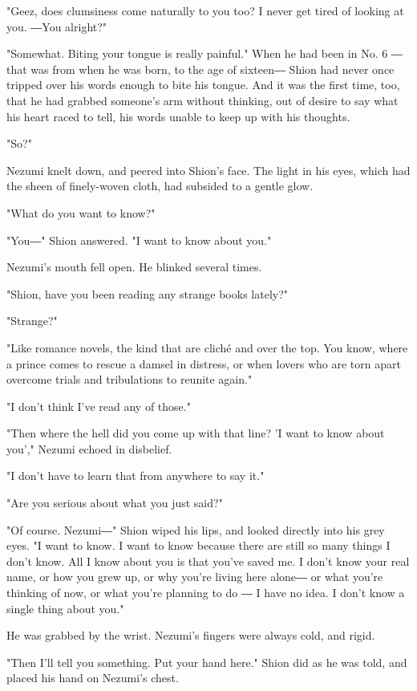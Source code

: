 "Geez, does clumsiness come naturally to you too? I never get tired of
looking at you. ―You alright?"

"Somewhat. Biting your tongue is really painful." When he had been in
No. 6 ― that was from when he was born, to the age of sixteen― Shion had
never once tripped over his words enough to bite his tongue. And it was
the first time, too, that he had grabbed someone's arm without thinking,
out of desire to say what his heart raced to tell, his words unable to
keep up with his thoughts.

"So?"

Nezumi knelt down, and peered into Shion's face. The light in his eyes,
which had the sheen of finely-woven cloth, had subsided to a gentle
glow.

"What do you want to know?"

"You―" Shion answered. "I want to know about you."

Nezumi's mouth fell open. He blinked several times.

"Shion, have you been reading any strange books lately?"

"Strange?"

"Like romance novels, the kind that are cliché and over the top. You
know, where a prince comes to rescue a damsel in distress, or when
lovers who are torn apart overcome trials and tribulations to reunite
again."

"I don't think I've read any of those."

"Then where the hell did you come up with that line? 'I want to know
about you'," Nezumi echoed in disbelief.

"I don't have to learn that from anywhere to say it."

"Are you serious about what you just said?"

"Of course. Nezumi―" Shion wiped his lips, and looked directly into his
grey eyes. "I want to know. I want to know because there are still so
many things I don't know. All I know about you is that you've saved me.
I don't know your real name, or how you grew up, or why you're living
here alone― or what you're thinking of now, or what you're planning to
do ― I have no idea. I don't know a single thing about you."

He was grabbed by the wrist. Nezumi's fingers were always cold, and
rigid.

"Then I'll tell you something. Put your hand here." Shion did as he was
told, and placed his hand on Nezumi's chest.

